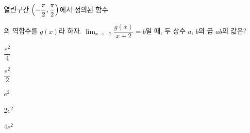 열린구간 $\left(-\dfrac{\pi}{2}{,}\mkern3mu\mathopen{}\dfrac{\pi}{2}\right)$에서 정의된 함수 \par\smallskip{}\par\smallskip\noindent 의 역함수를 $g(x)$라 하자. $\displaystyle\lim_{x\to -2}\dfrac{g(x)}{x+2}=b$일 때, 두 상수 $a$, $b$의 곱 $ab$의 값은? 
\begin{choices32}{\rule[-3ex]{0pt}{8ex}$\dfrac{e^2}{4}$}{\rule[-3ex]{0pt}{8ex}$\dfrac{e^2}{2}$}{\rule[-3ex]{0pt}{8ex}$e^2$}{\rule[-3ex]{0pt}{8ex}$2e^2$}{\rule[-3ex]{0pt}{8ex}$4e^2$}\end{choices32}
